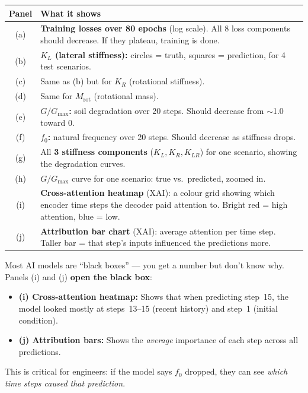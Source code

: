 \documentclass[11pt,a4paper]{article}
\begin{document}
\begin{center}
\small
\begin{tabular}{cp{9cm}}
\toprule
\textbf{Panel} & \textbf{What it shows} \\
\midrule
(a) & \textbf{Training losses over 80 epochs} (log scale).
      All 8 loss components should decrease.  If they plateau,
      training is done. \\
(b) & \textbf{$K_L$ (lateral stiffness):} circles = truth,
      squares = prediction, for 4 test scenarios. \\
(c) & Same as (b) but for \textbf{$K_R$} (rotational stiffness). \\
(d) & Same for \textbf{$M_{\text{rot}}$} (rotational mass). \\
(e) & \textbf{$G/G_{\max}$:} soil degradation over 20 steps.
      Should decrease from $\sim$1.0 toward 0. \\
(f) & \textbf{$f_0$:} natural frequency over 20 steps.
      Should decrease as stiffness drops. \\
(g) & All \textbf{3 stiffness components} ($K_L, K_R, K_{LR}$)
      for one scenario, showing the degradation curves. \\
(h) & \textbf{$G/G_{\max}$} curve for one scenario:
      true vs.\ predicted, zoomed in. \\
(i) & \textbf{Cross-attention heatmap} (XAI): a colour grid showing
      which encoder time steps the decoder paid attention to.
      Bright red = high attention, blue = low. \\
(j) & \textbf{Attribution bar chart} (XAI): average attention per
      time step.  Taller bar = that step's inputs influenced the
      predictions more. \\
\bottomrule
\end{tabular}
\end{center}

\begin{keybox}
Most AI models are ``black boxes'' --- you get a number but don't know
why.  Panels (i) and (j) \textbf{open the black box}:
\begin{itemize}[nosep]
  \item \textbf{(i) Cross-attention heatmap:}  Shows that when
        predicting step~15, the model looked mostly at
        steps~13--15 (recent history) and step~1 (initial condition).
  \item \textbf{(j) Attribution bars:}  Shows the \emph{average}
        importance of each step across all predictions.
\end{itemize}
This is critical for engineers: if the model says $f_0$ dropped,
they can see \emph{which time steps caused that prediction}.
\end{keybox}
\end{document}
